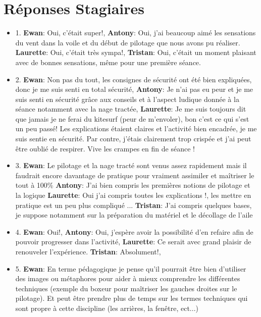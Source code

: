 \documentclass[11pt,a4paper]{report}
\begin{document}
\chapter{Réponses Stagiaires\label{reponses}}

\begin{itemize}
\item 1. \textbf{Ewan}: Oui, c'était super!, \textbf{Antony}: Oui, j'ai
beaucoup aimé les sensations du vent  dans la voile et du début de
pilotage que nous avons  pu réaliser.                                      
\textbf{Laurette}: Oui, c'était très sympa!, \textbf{Tristan}: Oui,
c'était un moment plaisant avec de bonnes sensations, m\^eme pour
une première séance.
\item 2. \textbf{Ewan}: Non pas du tout, les consignes de sécurité
ont été bien expliquées, donc je me suis senti en total sécurité,
\textbf{Antony}: Je n'ai pas eu peur et je me suis senti en
sécurité gr\^ace aux conseils et à l'aspect ludique donnée à la séance 
notamment avec la nage tractée, \textbf{Laurette}: Je me suis
toujours dit que jamais je ne ferai du kitesurf (peur de m'envoler),
bon c'est ce qui s'est un peu passé! Les explications étaient 
claires et l'activité bien encadrée, je me suis sentie en sécurité.
Par contre, j'étais clairement trop crispée et j'ai peut \^etre
oublié de respirer. Vive les crampes en fin de séance ! 
\item 3. \textbf{Ewan}: Le pilotage et la nage tracté sont venus
assez rapidement mais il faudrait encore davantage de pratique
pour vraiment assimiler et maîtriser le tout à 100\%
\textbf{Antony}: J'ai bien compris les premières notions de
pilotage et la logique \textbf{Laurette}: Oui j'ai compris
toutes les explications !, les mettre en pratique est un
peu plus compliqué ...
\textbf{Tristan}: J'ai compris quelques bases, je suppose
notamment sur la préparation du matériel et le décollage de l'aile
\item 4. \textbf{Ewan}: Oui!, \textbf{Antony}: Oui, j'espère
avoir la possibilité d'en refaire afin de pouvoir progresser
dans l'activité, \textbf{Laurette}: Ce serait avec grand plaisir
de renouveler l'expérience.
\textbf{Tristan}: Absolument!, 
\item 5. \textbf{Ewan}: En terme pédagogique je pense qu'il
pourrait \^etre bien d'utiliser des images ou métaphores pour
aider à mieux comprendre les différentes techniques (exemple
du boxeur pour maîtriser les gauches droites sur le  pilotage).
Et peut \^etre prendre plus de temps sur les termes techniques
qui sont propre à cette discipline (les arrières, la fen\^etre, ect...) 

\end{itemize}
\end{document}
